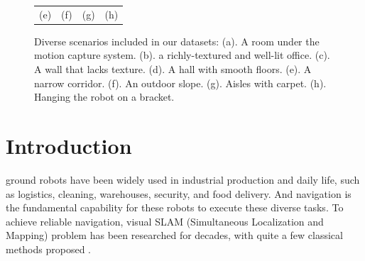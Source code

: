 \documentclass[conference]{IEEEtran}
\begin{document}
\begin{figure}
\begin{center}
\begin{tabular}{cccc}
				\\
				(e) & (f) & (g) & (h)\\			
			\end{tabular}
		\end{center}
		\caption{Diverse scenarios included in our datasets: (a). A room under the motion capture system. (b). a richly-textured and well-lit office. (c). A wall that lacks texture. (d). A hall with smooth floors. (e). A narrow corridor. (f). An outdoor slope. (g). Aisles with carpet. (h). Hanging the robot on a bracket. }
		\label{scenarios}
	\end{figure}


\section{Introduction}


 ground robots have been widely used in industrial production and daily life, such as logistics, cleaning, warehouses, security, and food delivery. And navigation is the fundamental capability for these robots to execute these diverse tasks. To achieve reliable navigation, visual SLAM (Simultaneous Localization and Mapping) problem has been researched for decades, with quite a few classical methods proposed \cite{cadena2016past}. 
\end{document}
